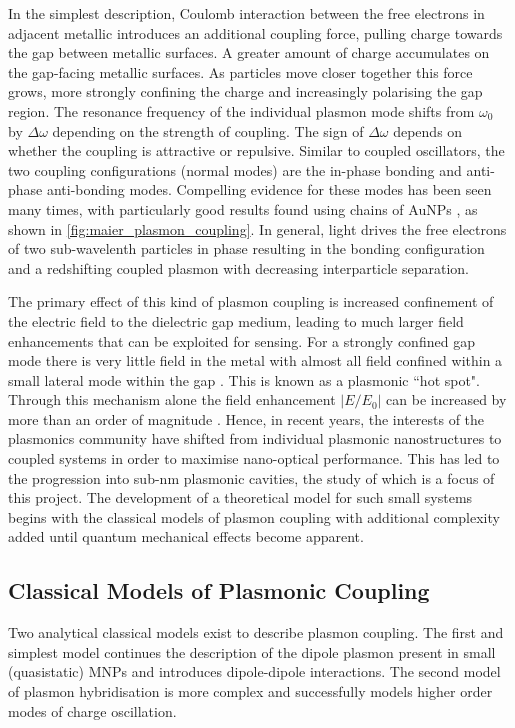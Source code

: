 \documentclass{article}
\begin{document}
In the simplest description, Coulomb interaction between the free electrons in adjacent metallic introduces an additional coupling force, pulling charge towards the gap between metallic surfaces. A greater amount of charge accumulates on the gap-facing metallic surfaces. As particles move closer together this force grows, more strongly confining the charge and increasingly polarising the gap region. The  resonance frequency of the individual plasmon mode shifts from $\omega_0$ by $\Delta\omega$ depending on the strength of coupling. The sign of $\Delta\omega$ depends on whether the coupling is attractive or repulsive. Similar to coupled oscillators, the two coupling configurations (normal modes) are the in-phase bonding and anti-phase anti-bonding modes. Compelling evidence for these modes has been seen many times, with particularly good results found using chains of AuNPs \cite{maier2002}, as shown in \autoref{fig:maier_plasmon_coupling}.
In general, light drives the free electrons of two sub-wavelenth particles in phase resulting in the bonding configuration and a redshifting coupled plasmon with decreasing interparticle separation.

The primary effect of this kind of plasmon coupling is increased confinement of the electric field to the dielectric gap medium, leading to much larger field enhancements that can be exploited for sensing. For a strongly confined gap mode there is very little field in the metal with almost all field confined within a small lateral mode within the gap \cite{romero2006}. This is known as a plasmonic ``hot spot". Through this mechanism alone the field enhancement $\left|E/E_0\right|$ can be increased by more than an order of magnitude \cite{hao2004, talley2005}. Hence, in recent years, the interests of the plasmonics community have shifted from individual plasmonic nanostructures to coupled systems in order to maximise nano-optical performance. This has led to the progression into sub-nm plasmonic cavities, the study of which is a focus of this project. The development of a theoretical model for such small systems begins with the classical models of plasmon coupling with additional complexity added until quantum mechanical effects become apparent.

\subsection{Classical Models of Plasmonic Coupling}

Two analytical classical models exist to describe plasmon coupling. The first and simplest model continues the description of the dipole plasmon present in small (quasistatic) MNPs and introduces dipole-dipole interactions. The second model of plasmon hybridisation is more complex and successfully models higher order modes of charge oscillation.
\end{document}
